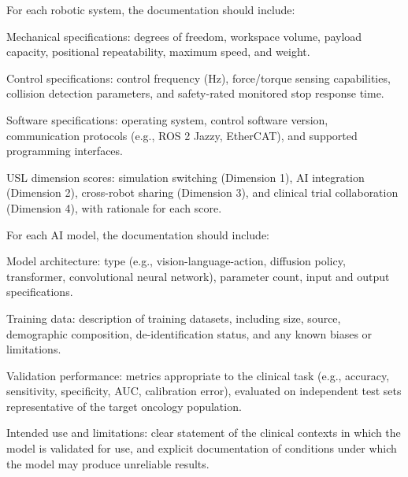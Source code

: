 \documentclass[11pt]{article}
\begin{document}
For each robotic system, the documentation should include:

\begin{description}[leftmargin=2.5cm,style=sameline]

\item[(a)] Mechanical specifications: degrees of freedom, workspace volume, payload capacity, positional repeatability, maximum speed, and weight.

\item[(b)] Control specifications: control frequency (Hz), force/torque sensing capabilities, collision detection parameters, and safety-rated monitored stop response time.

\item[(c)] Software specifications: operating system, control software version, communication protocols (e.g., ROS 2 Jazzy, EtherCAT), and supported programming interfaces.

\item[(d)] USL dimension scores: simulation switching (Dimension 1), AI integration (Dimension 2), cross-robot sharing (Dimension 3), and clinical trial collaboration (Dimension 4), with rationale for each score.

\end{description}

For each AI model, the documentation should include:

\begin{description}[leftmargin=2.5cm,style=sameline]

\item[(a)] Model architecture: type (e.g., vision-language-action, diffusion policy, transformer, convolutional neural network), parameter count, input and output specifications.

\item[(b)] Training data: description of training datasets, including size, source, demographic composition, de-identification status, and any known biases or limitations.

\item[(c)] Validation performance: metrics appropriate to the clinical task (e.g., accuracy, sensitivity, specificity, AUC, calibration error), evaluated on independent test sets representative of the target oncology population.

\item[(d)] Intended use and limitations: clear statement of the clinical contexts in which the model is validated for use, and explicit documentation of conditions under which the model may produce unreliable results.

\end{description}
\end{document}
